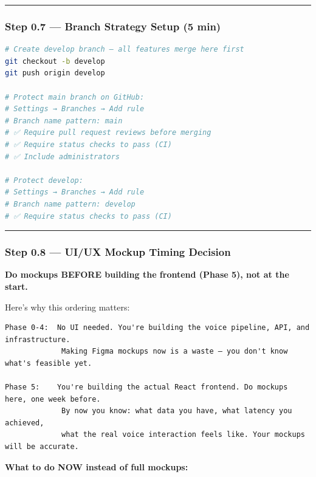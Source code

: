 \documentclass[
  11pt,
]{article}
\begin{document}
\begin{center}\rule{0.5\linewidth}{0.5pt}\end{center}

\hypertarget{step-0.7-branch-strategy-setup-5-min}{%
\subsubsection{Step 0.7 --- Branch Strategy Setup (5
min)}\label{step-0.7-branch-strategy-setup-5-min}}

\begin{lstlisting}[language=bash]
# Create develop branch — all features merge here first
git checkout -b develop
git push origin develop

# Protect main branch on GitHub:
# Settings → Branches → Add rule
# Branch name pattern: main
# ✅ Require pull request reviews before merging
# ✅ Require status checks to pass (CI)
# ✅ Include administrators

# Protect develop:
# Settings → Branches → Add rule
# Branch name pattern: develop
# ✅ Require status checks to pass (CI)
\end{lstlisting}

\begin{center}\rule{0.5\linewidth}{0.5pt}\end{center}

\hypertarget{step-0.8-uiux-mockup-timing-decision}{%
\subsubsection{Step 0.8 --- UI/UX Mockup Timing
Decision}\label{step-0.8-uiux-mockup-timing-decision}}

\textbf{Do mockups BEFORE building the frontend (Phase 5), not at the
start.}

Here's why this ordering matters:

\begin{lstlisting}
Phase 0-4:  No UI needed. You're building the voice pipeline, API, and infrastructure.
             Making Figma mockups now is a waste — you don't know what's feasible yet.

Phase 5:    You're building the actual React frontend. Do mockups here, one week before.
             By now you know: what data you have, what latency you achieved,
             what the real voice interaction feels like. Your mockups will be accurate.
\end{lstlisting}

\textbf{What to do NOW instead of full mockups:}
\end{document}
